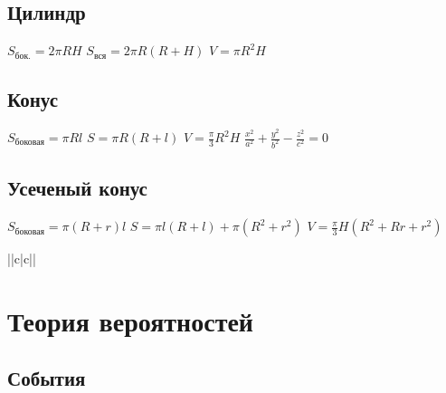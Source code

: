 \subsection{Цилиндр}
$ S_\text{бок.} = 2 \pi R H $
$ S_\text{вся} = 2 \pi R (R+H) $
$ V = \pi R^2 H $
\subsection{Конус}
$ S_{\text{боковая}} = \pi R l $
$ S = \pi R (R + l) $
$ V = \frac{\pi}{3} R^2 H $
$ \frac{x^2}{a^2} + \frac{y^2}{b^2} - \frac{z^2}{c^2} = 0 $
\subsection{Усеченый конус}
$ S_{\text{боковая}} = \pi (R+r) l $
$ S = \pi l (R + l) + \pi (R^2 + r^2) $
$ V = \frac{\pi}{3} H (R^2 + Rr + r^2) $
\begin{tabu}[t]{||c|c||}
	\hline
		 \\
	\hline
	\hline
	\hline
	\hline
	\hline
	\hline
	\hline
	\hline
\end{tabu}
\section{Теория вероятностей}
\subsection{События}
